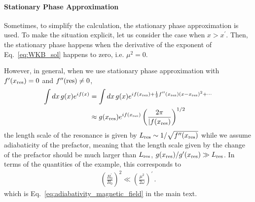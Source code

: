 \documentclass[a4paper,11pt]{article}
\begin{document}
\paragraph{Stationary Phase Approximation} 
Sometimes, to simplify the calculation, the stationary phase approximation is used. 
%
To make the situation explicit, let us consider the case when $ x > x^{\prime} $.
%
Then, the stationary phase happens when the derivative of the exponent of Eq.~\eqref{eq:WKB_sol} happens to zero, i.e. $ \mu^{2} = 0 $.


However, in general, when we use stationary phase approximation with $ f^{\prime}(x_{\rm res}) = 0 $ and $ f^{\prime\prime}(\rm res) \neq 0 $,
%
\begin{equation}
    \begin{aligned}
    \int dx \, g(x) e^{i f(x)}  & = \int dx \, g(x) e^{i f(x_{\rm res}) + \frac{1}{2} f^{\prime\prime}(x_{\rm res}) (x-x_{\rm res})^{2} + \cdots  } \\
    &\approx g(x_{\rm res}) e^{i f(x_{\rm res}) }  \left( \frac{2\pi}{\vert f(x_{\rm res}) } \right)^{1/2}
    \end{aligned}    
\end{equation}
%
the length scale of the resonance is given by $ L_{\rm res} \sim 1 / \sqrt{ f^{\prime\prime}(x_{\rm res})  } $
while we assume adiabaticity of the prefactor, meaning that the length scale given by the change of the prefactor should be much larger than $ L_{\rm res} $, $ g(x_{\rm res})/g^{\prime}(x_{\rm res}) \gg L_{\rm res} $.
%
In terms of the quantities of the example, this corresponds to
\begin{align}
    \left( \frac{B_{0}^{\prime}}{B_{0}} \right)^{2} \ll \left( \frac{ \mu^{2} }{2 \omega} \right)^{\prime} \,. 
\end{align}
%
which is Eq.~\eqref{eq:adiabativity_magnetic_field} in the main text.
%




\end{document}
